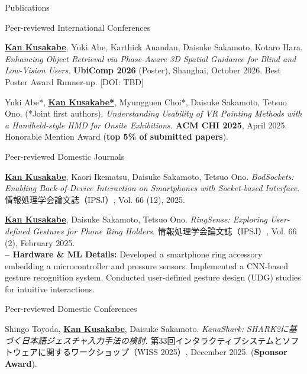 \documentclass[
    11pt, %
]{resume} %
\begin{document}
\begin{rSection}{Publications}

\begin{rSubsection}{Peer-reviewed International Conferences}{}{}{}
    \item \underline{\textbf{Kan Kusakabe}}, Yuki Abe, Karthick Anandan, Daisuke Sakamoto, Kotaro Hara.
    \textit{Enhancing Object Retrieval via Phase-Aware 3D Spatial Guidance for Blind and Low-Vision Users.}
    \textbf{UbiComp 2026} (Poster), Shanghai, October 2026. Best Poster Award Runner-up. [DOI: TBD]
    \item Yuki Abe*, \underline{\textbf{Kan Kusakabe*}}, Myungguen Choi*, Daisuke Sakamoto, Tetsuo Ono. (*Joint first authors).
    \textit{Understanding Usability of VR Pointing Methods with a Handheld-style HMD for Onsite Exhibitions.}
    \textbf{ACM CHI 2025}, April 2025. Honorable Mention Award (\textbf{top 5\% of submitted papers}).
\end{rSubsection}

\begin{rSubsection}{Peer-reviewed Domestic Journals}{}{}{}
    \item \underline{\textbf{Kan Kusakabe}}, Kaori Ikematsu, Daisuke Sakamoto, Tetsuo Ono.
    \textit{BodSockets: Enabling Back-of-Device Interaction on Smartphones with Socket-based Interface}.
    情報処理学会論文誌（IPSJ）, Vol. 66 (12), 2025.
    \item \underline{\textbf{Kan Kusakabe}}, Daisuke Sakamoto, Tetsuo Ono.
    \textit{RingSense: Exploring User-defined Gestures for Phone Ring Holders}.
    情報処理学会論文誌（IPSJ）, Vol. 66 (2), February 2025.\\
    \textbf{-- Hardware \& ML Details:} Developed a smartphone ring accessory embedding a microcontroller and pressure sensors. Implemented a CNN-based gesture recognition system. Conducted user-defined gesture design (UDG) studies for intuitive interactions.
\end{rSubsection}

\begin{rSubsection}{Peer-reviewed Domestic Conferences}{}{}{}
    \item Shingo Toyoda, \underline{\textbf{Kan Kusakabe}}, Daisuke Sakamoto.
    \textit{KanaShark: SHARK2に基づく日本語ジェスチャ入力手法の検討}.
    第33回インタラクティブシステムとソフトウェアに関するワークショップ（WISS 2025）, December 2025. (\textbf{Sponsor Award}).


\end{rSubsection}
\end{rSection}
\end{document}
